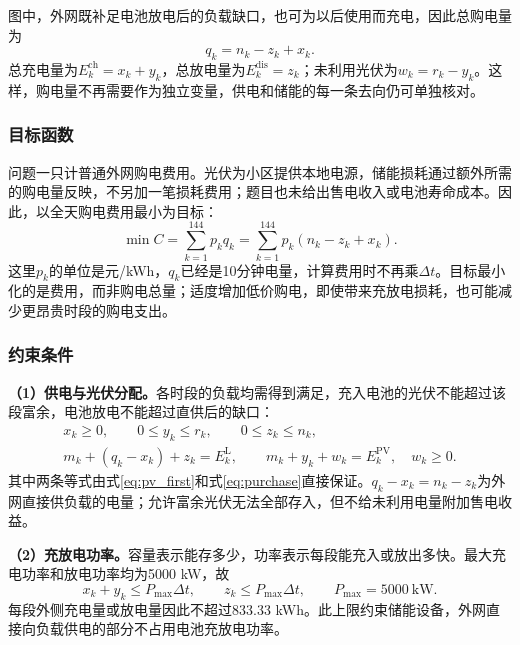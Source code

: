 图中，外网既补足电池放电后的负载缺口，也可为以后使用而充电，因此总购电量为
\begin{equation}
 q_k=n_k-z_k+x_k. \label{eq:purchase}
\end{equation}
总充电量为$E^{\mathrm{ch}}_k=x_k+y_k$，总放电量为$E^{\mathrm{dis}}_k=z_k$；未利用光伏为$w_k=r_k-y_k$。这样，购电量不再需要作为独立变量，供电和储能的每一条去向仍可单独核对。

\subsubsection{目标函数}
问题一只计普通外网购电费用。光伏为小区提供本地电源，储能损耗通过额外所需的购电量反映，不另加一笔损耗费用；题目也未给出售电收入或电池寿命成本。因此，以全天购电费用最小为目标：
\begin{equation}
 \min C=\sum_{k=1}^{144}p_kq_k
       =\sum_{k=1}^{144}p_k(n_k-z_k+x_k).
 \label{eq:objective}
\end{equation}
这里$p_k$的单位是元/kWh，$q_k$已经是10分钟电量，计算费用时不再乘$\Delta t$。目标最小化的是费用，而非购电总量；适度增加低价购电，即使带来充放电损耗，也可能减少更昂贵时段的购电支出。

\subsubsection{约束条件}
\textbf{（1）供电与光伏分配。}各时段的负载均需得到满足，充入电池的光伏不能超过该段富余，电池放电不能超过直供后的缺口：
\begin{equation}
 \begin{gathered}
 x_k\geq0,\qquad 0\leq y_k\leq r_k,\qquad 0\leq z_k\leq n_k,\\
 m_k+(q_k-x_k)+z_k=E^{\mathrm L}_k,\qquad
 m_k+y_k+w_k=E^{\mathrm{PV}}_k,\quad w_k\geq0.
 \end{gathered}
 \label{eq:balance}
\end{equation}
其中两条等式由式\eqref{eq:pv_first}和式\eqref{eq:purchase}直接保证。$q_k-x_k=n_k-z_k$为外网直接供负载的电量；允许富余光伏无法全部存入，但不给未利用电量附加售电收益。

\textbf{（2）充放电功率。}容量表示能存多少，功率表示每段能充入或放出多快。最大充电功率和放电功率均为5000 kW，故
\begin{equation}
 x_k+y_k\leq P_{\max}\Delta t,\qquad z_k\leq P_{\max}\Delta t,
 \qquad P_{\max}=5000\ \mathrm{kW}.
 \label{eq:power}
\end{equation}
每段外侧充电量或放电量因此不超过833.33 kWh。此上限约束储能设备，外网直接向负载供电的部分不占用电池充放电功率。

